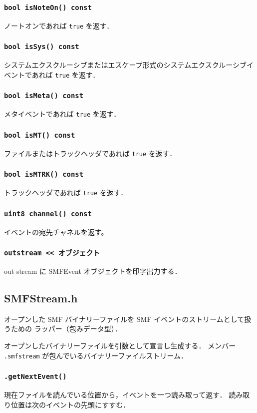 \documentclass[11pt]{jreport}
\begin{document}
\subsubsection*{\tt bool isNoteOn() const}
ノートオンであれば \verb+true+ を返す．

\subsubsection*{\tt bool isSys() const}
システムエクスクルーシブまたはエスケープ形式のシステムエクスクルーシブイベントであれば \verb+true+ を返す．

\subsubsection*{\tt bool isMeta() const}
メタイベントであれば \verb+true+ を返す．

\subsubsection*{\tt bool isMT() const}
ファイルまたはトラックヘッダであれば \verb+true+ を返す．

\subsubsection*{\tt bool isMTRK() const}
トラックヘッダであれば \verb+true+ を返す．

\subsubsection*{\tt uint8 channel() const}
イベントの宛先チャネルを返す。

\subsubsection*{\tt outstream << オブジェクト}
out stream に SMFEvent オブジェクトを印字出力する．


\subsection*{SMFStream.h}
オープンした SMF バイナリーファイルを SMF イベントのストリームとして扱うための
ラッパー（包みデータ型）．

オープンしたバイナリーファイルを引数として宣言し生成する．
メンバー \verb+.smfstream+ が包んでいるバイナリーファイルストリーム．

\subsubsection*{\tt .getNextEvent()}
現在ファイルを読んでいる位置から，イベントを一つ読み取って返す．
読み取り位置は次のイベントの先頭にすすむ．
\end{document}
